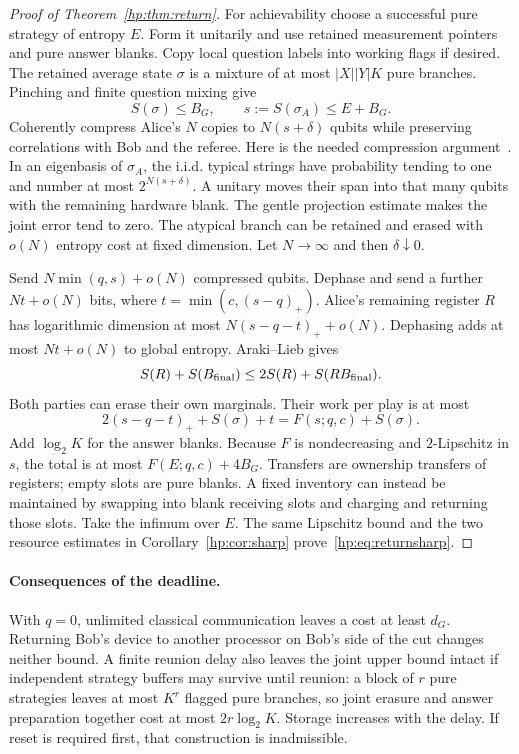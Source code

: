 \begin{proof}[Proof of Theorem~\ref{hp:thm:return}]
For achievability choose a successful pure strategy of entropy $E$. Form it unitarily and use retained measurement pointers and pure answer blanks. Copy local question labels into working flags if desired. The retained average state $\sigma$ is a mixture of at most $|X||Y|K$ pure branches. Pinching and finite question mixing give
\[
 S(\sigma)\le B_G,\qquad s:=S(\sigma_A)\le E+B_G.
\]
Coherently compress Alice's $N$ copies to $N(s+\delta)$ qubits while preserving correlations with Bob and the referee. Here is the needed compression argument~\cite{HPschumacher}. In an eigenbasis of $\sigma_A$, the i.i.d. typical strings have probability tending to one and number at most $2^{N(s+\delta)}$. A unitary moves their span into that many qubits with the remaining hardware blank. The gentle projection estimate makes the joint error tend to zero. The atypical branch can be retained and erased with $o(N)$ entropy cost at fixed dimension. Let $N\to\infty$ and then $\delta\downarrow0$.

Send $N\min(q,s)+o(N)$ compressed qubits. Dephase and send a further $Nt+o(N)$ bits, where $t=\min(c,(s-q)_+)$. Alice's remaining register $R$ has logarithmic dimension at most $N(s-q-t)_++o(N)$. Dephasing adds at most $Nt+o(N)$ to global entropy. Araki--Lieb gives
\[
 S(R)+S(B_{\rm final})\le2S(R)+S(RB_{\rm final}).
\]
Both parties can erase their own marginals. Their work per play is at most
\[
 2(s-q-t)_++S(\sigma)+t=F(s;q,c)+S(\sigma).
\]
Add $\log_2K$ for the answer blanks. Because $F$ is nondecreasing and $2$-Lipschitz in $s$, the total is at most $F(E;q,c)+4B_G$. Transfers are ownership transfers of registers; empty slots are pure blanks. A fixed inventory can instead be maintained by swapping into blank receiving slots and charging and returning those slots. Take the infimum over $E$. The same Lipschitz bound and the two resource estimates in Corollary~\ref{hp:cor:sharp} prove~\eqref{hp:eq:returnsharp}.
\end{proof}

\paragraph{Consequences of the deadline.}
With $q=0$, unlimited classical communication leaves a cost at least $d_G$. Returning Bob's device to another processor on Bob's side of the cut changes neither bound. A finite reunion delay also leaves the joint upper bound intact if independent strategy buffers may survive until reunion: a block of $r$ pure strategies leaves at most $K^r$ flagged pure branches, so joint erasure and answer preparation together cost at most $2r\log_2K$. Storage increases with the delay. If reset is required first, that construction is inadmissible.

